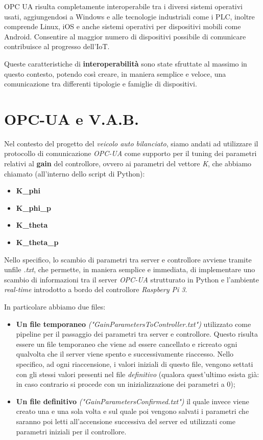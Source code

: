 OPC UA risulta completamente interoperabile tra i diversi sistemi operativi usati, aggiungendosi a Windows e alle tecnologie industriali come i PLC, inoltre comprende Linux, iOS e anche sistemi operativi per dispositivi mobili come Android. Consentire al maggior numero di dispositivi possibile di comunicare contribuisce al progresso dell'IoT.

Queste caratteristiche di \textbf{interoperabilità} sono state sfruttate al massimo in questo contesto, potendo così creare, in maniera semplice e veloce, una comunicazione tra differenti tipologie e famiglie di dispositivi.

\section{OPC-UA e V.A.B.}
Nel contesto del progetto del \textit{veicolo auto bilanciato}, siamo andati ad utilizzare il protocollo di comunicazione \textit{OPC-UA} come supporto per il tuning dei parametri relativi al \textbf{gain} del controllore, ovvero ai parametri del vettore \textit{K}, che abbiamo chiamato (all'interno dello script di Python):
\begin{itemize}
	\item \textbf{K\_phi}
	\item \textbf{K\_phi\_p}
	\item \textbf{K\_theta}
	\item \textbf{K\_theta\_p}
\end{itemize}

Nello specifico, lo scambio di parametri tra server e controllore avviene tramite unfile \textit{.txt}, che permette, in maniera semplice e immediata, di implementare uno scambio di informazioni tra il server \textit{OPC-UA} strutturato in Python e l'ambiente \textit{real-time} introdotto a bordo del controllore \textit{Raspbery Pi 3}.


In particolare abbiamo due files:
\begin{itemize}
	\item \textbf{Un file temporaneo} \textit{("GainParametersToController.txt")} utilizzato come pipeline per il passaggio dei parametri tra server e controllore. Questo risulta essere un file temporaneo che viene ad essere cancellato e ricreato ogni qualvolta che il server viene spento e successivamente riaccesso.
	Nello specifico, ad ogni riaccensione, i valori iniziali di questo file, vengono settati con gli stessi valori presenti nel file \textit{definitivo}  (qualora quest'ultimo esista già: in caso contrario si procede con un inizializzazione dei parametri a 0);
	
	\item \textbf{Un file definitivo} \textit{("GainParametersConfirmed.txt")} il quale invece viene creato una e una sola volta e sul quale poi vengono salvati i parametri che saranno poi letti all'accensione successiva del server ed utilizzati come parametri iniziali per il controllore.
\end{itemize}

